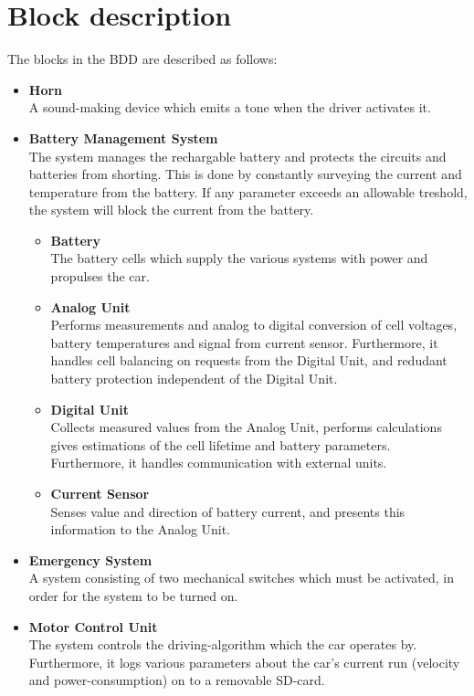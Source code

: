 \section{Block description}
The blocks in the BDD are described as follows:

\begin{itemize}
	\item \textbf{Horn}\\
	A sound-making device which emits a tone when the driver activates it.
	\item \textbf{Battery Management System}\\
	The system manages the rechargable battery and protects the circuits and batteries from shorting. This is done by constantly surveying the current and temperature from the battery. If any parameter exceeds an allowable treshold, the system will block the current from the battery.
	\begin{itemize}
		\item \textbf{Battery}\\
		The battery cells which supply the various systems with power and propulses the car.
		\item \textbf{Analog Unit}\\
		Performs measurements and analog to digital conversion of cell voltages, battery temperatures and signal from current sensor. Furthermore, it handles cell balancing on requests from the Digital Unit, and redudant battery protection independent of the Digital Unit.
		\item \textbf{Digital Unit}\\
		Collects measured values from the Analog Unit, performs calculations gives estimations of the cell lifetime and battery parameters. Furthermore, it handles communication with external units.
		\item \textbf{Current Sensor}\\
		Senses value and direction of battery current, and presents this information to the Analog Unit.
	\end{itemize}
	\item \textbf{Emergency System}\\
	A system  consisting of two mechanical switches  which must be activated, in order for the system to be turned on.
	\item \textbf{Motor Control Unit}\\
	The system controls the driving-algorithm which the car operates by. Furthermore, it logs various parameters about the car's current run (velocity and power-consumption) on to a removable SD-card.

\end{itemize}
